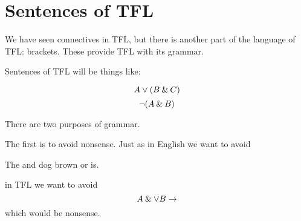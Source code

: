 \chapter{Sentences of TFL}\label{s:TFLSentences}

We have seen connectives in TFL, but there is another part of the language of TFL: brackets. These provide TFL with its grammar.

Sentences of TFL will be things like:

$$A\vee (B\mathbin{\&} C)$$ $$\neg (A\mathbin{\&} B)$$

There are two purposes of grammar.

The first is to avoid nonsense.
Just as in English we want to avoid
\begin{center}
The and dog brown or is.
\end{center}
in TFL we want to avoid
$$A\mathbin{\&}\vee B\rightarrow$$
which would be nonsense.



